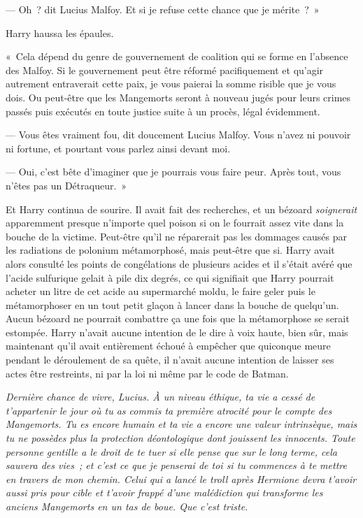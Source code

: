 --- Oh~? dit Lucius Malfoy.
Et si je refuse cette chance que je mérite~?~»

Harry haussa les épaules.

«~Cela dépend du genre de gouvernement de coalition qui se forme en l'absence des Malfoy.
Si le gouvernement peut être réformé pacifiquement et qu'agir autrement entraverait cette paix, je vous paierai la somme risible que je vous dois.
Ou peut-être que les Mangemorts seront à nouveau jugés pour leurs crimes passés puis exécutés en toute justice suite à un procès, légal évidemment.

--- Vous êtes vraiment fou, dit doucement Lucius Malfoy.
Vous n'avez ni pouvoir ni fortune, et pourtant vous parlez ainsi devant moi.

--- Oui, c'est bête d'imaginer que je pourrais vous faire peur.
Après tout, vous n'êtes pas un Détraqueur.~»

Et Harry continua de sourire.
Il avait fait des recherches, et un bézoard \emph{soignerait} apparemment presque n'importe quel poison si on le fourrait assez vite dans la bouche de la victime.
Peut-être qu'il ne réparerait pas les dommages causés par les radiations de polonium métamorphosé, mais peut-être que si.
Harry avait alors consulté les points de congélations de plusieurs acides et il s'était avéré que l'acide sulfurique gelait à pile dix degrés, ce qui signifiait que Harry pourrait acheter un litre de cet acide au supermarché moldu, le faire geler puis le métamorphoser en un tout petit glaçon à lancer dans la bouche de quelqu'un.
Aucun bézoard ne pourrait combattre ça une fois que la métamorphose se serait estompée.
Harry n'avait aucune intention de le dire à voix haute, bien sûr, mais maintenant qu'il avait entièrement échoué à empêcher que quiconque meure pendant le déroulement de sa quête, il n'avait aucune intention de laisser ses actes être restreints, ni par la loi ni même par le code de Batman.

\emph{Dernière chance de vivre, Lucius.
À un niveau éthique, ta vie a cessé de t'appartenir le jour où tu as commis ta première atrocité pour le compte des Mangemorts.
Tu es encore humain et ta vie a encore une valeur intrinsèque, mais tu ne possèdes plus la protection déontologique dont jouissent les innocents.
Toute personne gentille a le droit de te tuer si elle pense que sur le long terme, cela sauvera des vies~; et c'est ce que je penserai de toi si tu commences à te mettre en travers de mon chemin.
Celui qui a lancé le troll après Hermione devra t'avoir aussi pris pour cible et t'avoir frappé d'une malédiction qui transforme les anciens Mangemorts en un tas de boue.
Que c'est triste.}

